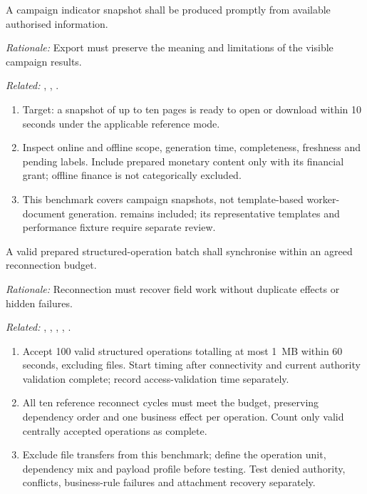 \label{nfr:PERF-07}
A campaign indicator snapshot shall be produced promptly from available authorised information.

\textit{Rationale:} Export must preserve the meaning and limitations of the visible campaign results.

\textit{Related:} \hyperref[fr:059]{}, \hyperref[fr:060]{}, \hyperref[fr:062]{}.
\begin{enumerate}[label=(\alph*),leftmargin=*,itemsep=1pt,topsep=3pt]
\item Target: a snapshot of up to ten pages is ready to open or download within 10 seconds under the applicable reference mode.
\item Inspect online and offline scope, generation time, completeness, freshness and pending labels. Include prepared monetary content only with its financial grant; offline finance is not categorically excluded.
\item This benchmark covers campaign snapshots, not template-based worker-document generation.  remains included; its representative templates and performance fixture require separate review.
\end{enumerate}

\label{nfr:PERF-08}
A valid prepared structured-operation batch shall synchronise within an agreed reconnection budget.

\textit{Rationale:} Reconnection must recover field work without duplicate effects or hidden failures.

\textit{Related:} \hyperref[fr:004]{}, \hyperref[fr:029]{}, \hyperref[fr:034]{}, \hyperref[fr:037]{}, \hyperref[fr:048]{}.
\begin{enumerate}[label=(\alph*),leftmargin=*,itemsep=1pt,topsep=3pt]
\item Accept 100 valid structured operations totalling at most 1~MB within 60 seconds, excluding files. Start timing after connectivity and current authority validation complete; record access-validation time separately.
\item All ten reference reconnect cycles must meet the budget, preserving dependency order and one business effect per operation. Count only valid centrally accepted operations as complete.
\item Exclude file transfers from this benchmark; define the operation unit, dependency mix and payload profile before testing. Test denied authority, conflicts, business-rule failures and attachment recovery separately.
\end{enumerate}

